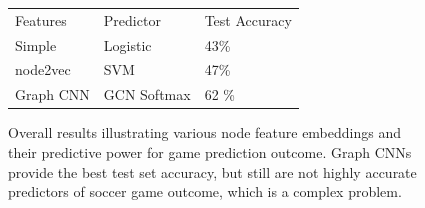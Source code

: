 \begin{figure}[h]
  \label{fig:results_table}
  \centering
    \begin{tabular}{l | l | l}
        \rowcolor{gray!20}
        Features & Predictor & Test Accuracy  \\
        \noalign{\smallskip}\hline\noalign{\smallskip}
        \rowcolor{green!20}
        Simple &  Logistic & 43\% \\
        \rowcolor{blue!20}
        node2vec &  SVM & 47\% \\
        \rowcolor{purple!20}
        Graph CNN & GCN Softmax & 62 \% \\ 
    \end{tabular}
  \caption{Overall results illustrating various node feature embeddings and their predictive power for game prediction outcome. Graph CNNs provide the best test set accuracy, but still are not highly accurate predictors of soccer game outcome, which is a complex problem.}
    \label{fig:results_table}
\end{figure}


